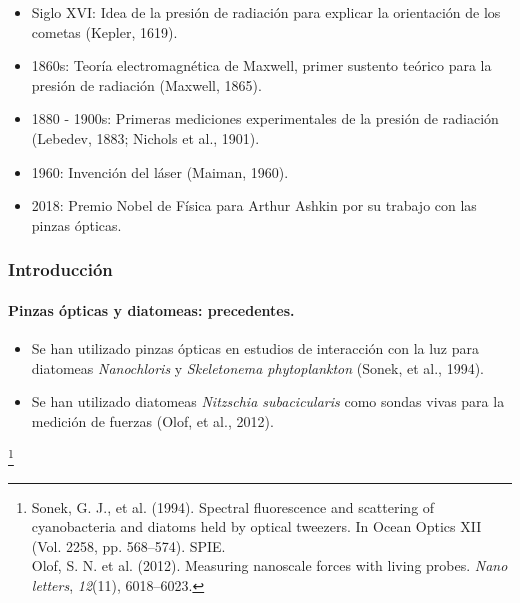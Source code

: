 \documentclass[10pt,aspectratio=1610,compress,dvipsnames]{beamer}
\newcommand\blfootnote[1]{%
  \begingroup
  \renewcommand\thefootnote{}\footnote{#1}%
  \addtocounter{footnote}{-1}%
  \endgroup
}
\begin{document}
\begin{frame}
{  
  \begin{itemize}
    \item Siglo XVI: Idea de la presión de radiación para explicar la orientación de los cometas (Kepler, 1619).
    \item 1860s: Teoría electromagnética de Maxwell, primer sustento teórico para la presión de radiación (Maxwell, 1865).
    \item 1880 - 1900s: Primeras mediciones experimentales de la presión de radiación (Lebedev, 1883; Nichols et al., 1901). 
    \item 1960: Invención del láser (Maiman, 1960).
    \ 
    \item 2018: Premio Nobel de Física para Arthur Ashkin por su trabajo con las pinzas ópticas.
  \end{itemize}



  }\end{frame}
  
  
  
\begin{frame}\frametitle{Introducción}
\framesubtitle{Pinzas ópticas y diatomeas: precedentes.}
\begin{itemize}
	\item Se han utilizado pinzas \'opticas en estudios de interacci\'on con la luz para diatomeas \textit{Nanochloris} y \textit{Skeletonema phytoplankton} (Sonek, et al., 1994). 
	\item Se han utilizado diatomeas \textit{Nitzschia subacicularis} como sondas vivas para la medici\'on de fuerzas (Olof, et al., 2012).
\end{itemize}

\blfootnote{Sonek, G. J., et al. (1994). Spectral fluorescence and scattering of cyanobacteria and diatoms held by optical tweezers. In Ocean Optics XII (Vol. 2258, pp. 568--574). SPIE. \\ \vspace{0.5em} \hspace{1.55em} Olof, S. N. et al. (2012). Measuring nanoscale forces with living probes. \textit{Nano letters}, \textit{12}(11), 6018--6023.}
\end{frame}
\end{document}

